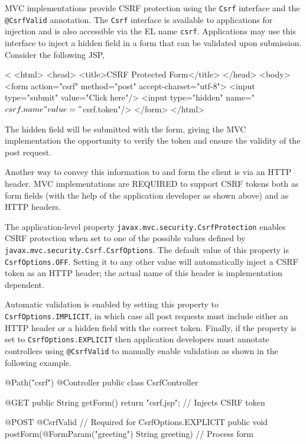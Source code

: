 MVC implementations provide CSRF protection using the {\tt Csrf} interface
and the {\tt @CsrfValid} annotation. The {\tt Csrf} interface is available to applications
for injection and is also accessible via the EL name {\tt csrf}. Applications may use
this interface to inject a hidden field in a form that can be validated upon submission.
Consider the following JSP,

\begin{listing}{1}
<%
<html>
<head>
    <title>CSRF Protected Form</title>
</head>
<body>
    <form action="csrf" method="post" accept-charset="utf-8">
        <input type="submit" value="Click here"/>
        <input type="hidden" name="${csrf.name}" value="${csrf.token}"/>
    </form>
</html>
\end{listing}

The hidden field will be submitted with the form, giving the MVC implementation
the opportunity to verify the token and ensure the validity of the post request. 

Another way to convey this information to and form the client is via an HTTP
header. MVC implementations are REQUIRED to support CSRF tokens both
as form fields (with the help of the application developer as shown above) and
as HTTP headers.

The application-level property {\tt javax.mvc.security.CsrfProtection} enables
 CSRF protection when set to one of the possible values defined by
{\tt javax.mvc.security.Csrf.CsrfOptions}. The default value of this property is
{\tt CsrfOptions.OFF}. Setting it to any other value will automatically inject a
CSRF token as an HTTP header; the actual name of this header is 
implementation dependent.

Automatic validation is enabled by setting this
property to {\tt CsrfOptions.IMPLICIT}, in which case all post requests
must include either an HTTP header or a hidden field with the correct token.
Finally, if the property is set to {\tt CsrfOptions.EXPLICIT} then application
developers must annotate controllers using {\tt @CsrfValid} to manually
enable validation  as shown in the following example.

\begin{listing}{1}
@Path("csrf")
@Controller
public class CsrfController {

    @GET
    public String getForm() {
        return "csrf.jsp";     // Injects CSRF token
    }

    @POST
    @CsrfValid		           // Required for CsrfOptions.EXPLICIT
    public void postForm(@FormParam("greeting") String greeting) {
        // Process form
    }
}
 \end{listing}

